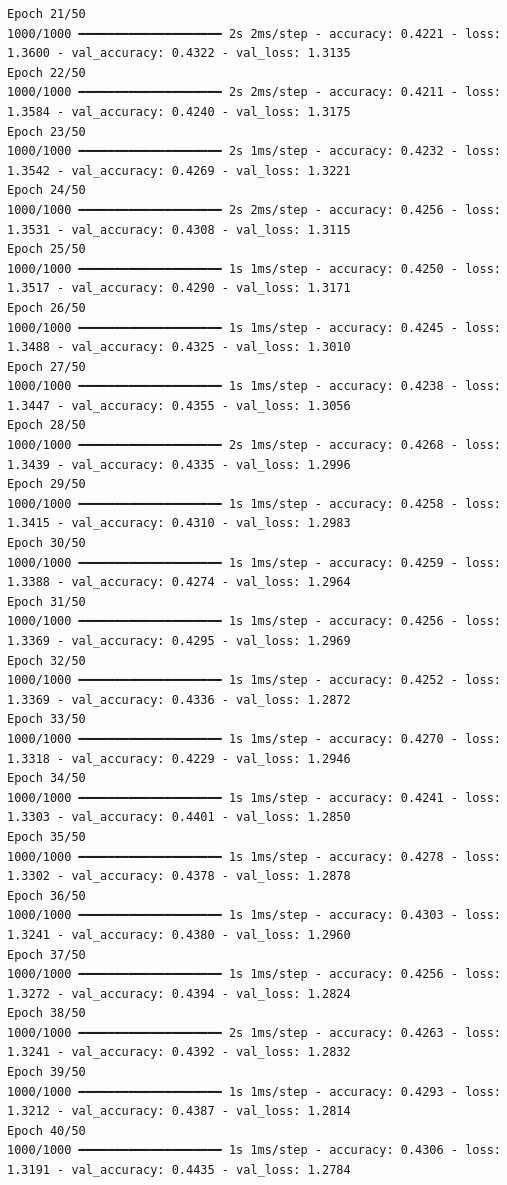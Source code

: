 \documentclass[
  letterpaper,
  DIV=11,
  numbers=noendperiod]{scrartcl}
\begin{document}
\begin{verbatim}
Epoch 21/50
1000/1000 ━━━━━━━━━━━━━━━━━━━━ 2s 2ms/step - accuracy: 0.4221 - loss: 1.3600 - val_accuracy: 0.4322 - val_loss: 1.3135
Epoch 22/50
1000/1000 ━━━━━━━━━━━━━━━━━━━━ 2s 2ms/step - accuracy: 0.4211 - loss: 1.3584 - val_accuracy: 0.4240 - val_loss: 1.3175
Epoch 23/50
1000/1000 ━━━━━━━━━━━━━━━━━━━━ 2s 1ms/step - accuracy: 0.4232 - loss: 1.3542 - val_accuracy: 0.4269 - val_loss: 1.3221
Epoch 24/50
1000/1000 ━━━━━━━━━━━━━━━━━━━━ 2s 2ms/step - accuracy: 0.4256 - loss: 1.3531 - val_accuracy: 0.4308 - val_loss: 1.3115
Epoch 25/50
1000/1000 ━━━━━━━━━━━━━━━━━━━━ 1s 1ms/step - accuracy: 0.4250 - loss: 1.3517 - val_accuracy: 0.4290 - val_loss: 1.3171
Epoch 26/50
1000/1000 ━━━━━━━━━━━━━━━━━━━━ 1s 1ms/step - accuracy: 0.4245 - loss: 1.3488 - val_accuracy: 0.4325 - val_loss: 1.3010
Epoch 27/50
1000/1000 ━━━━━━━━━━━━━━━━━━━━ 1s 1ms/step - accuracy: 0.4238 - loss: 1.3447 - val_accuracy: 0.4355 - val_loss: 1.3056
Epoch 28/50
1000/1000 ━━━━━━━━━━━━━━━━━━━━ 2s 1ms/step - accuracy: 0.4268 - loss: 1.3439 - val_accuracy: 0.4335 - val_loss: 1.2996
Epoch 29/50
1000/1000 ━━━━━━━━━━━━━━━━━━━━ 1s 1ms/step - accuracy: 0.4258 - loss: 1.3415 - val_accuracy: 0.4310 - val_loss: 1.2983
Epoch 30/50
1000/1000 ━━━━━━━━━━━━━━━━━━━━ 1s 1ms/step - accuracy: 0.4259 - loss: 1.3388 - val_accuracy: 0.4274 - val_loss: 1.2964
Epoch 31/50
1000/1000 ━━━━━━━━━━━━━━━━━━━━ 1s 1ms/step - accuracy: 0.4256 - loss: 1.3369 - val_accuracy: 0.4295 - val_loss: 1.2969
Epoch 32/50
1000/1000 ━━━━━━━━━━━━━━━━━━━━ 1s 1ms/step - accuracy: 0.4252 - loss: 1.3369 - val_accuracy: 0.4336 - val_loss: 1.2872
Epoch 33/50
1000/1000 ━━━━━━━━━━━━━━━━━━━━ 1s 1ms/step - accuracy: 0.4270 - loss: 1.3318 - val_accuracy: 0.4229 - val_loss: 1.2946
Epoch 34/50
1000/1000 ━━━━━━━━━━━━━━━━━━━━ 1s 1ms/step - accuracy: 0.4241 - loss: 1.3303 - val_accuracy: 0.4401 - val_loss: 1.2850
Epoch 35/50
1000/1000 ━━━━━━━━━━━━━━━━━━━━ 1s 1ms/step - accuracy: 0.4278 - loss: 1.3302 - val_accuracy: 0.4378 - val_loss: 1.2878
Epoch 36/50
1000/1000 ━━━━━━━━━━━━━━━━━━━━ 1s 1ms/step - accuracy: 0.4303 - loss: 1.3241 - val_accuracy: 0.4380 - val_loss: 1.2960
Epoch 37/50
1000/1000 ━━━━━━━━━━━━━━━━━━━━ 1s 1ms/step - accuracy: 0.4256 - loss: 1.3272 - val_accuracy: 0.4394 - val_loss: 1.2824
Epoch 38/50
1000/1000 ━━━━━━━━━━━━━━━━━━━━ 2s 1ms/step - accuracy: 0.4263 - loss: 1.3241 - val_accuracy: 0.4392 - val_loss: 1.2832
Epoch 39/50
1000/1000 ━━━━━━━━━━━━━━━━━━━━ 1s 1ms/step - accuracy: 0.4293 - loss: 1.3212 - val_accuracy: 0.4387 - val_loss: 1.2814
Epoch 40/50
1000/1000 ━━━━━━━━━━━━━━━━━━━━ 1s 1ms/step - accuracy: 0.4306 - loss: 1.3191 - val_accuracy: 0.4435 - val_loss: 1.2784

\end{verbatim}
\end{document}
